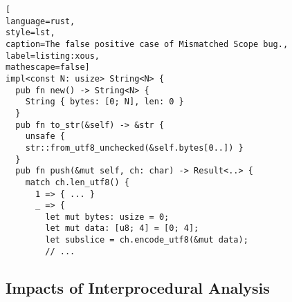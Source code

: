 \begin{lstlisting}[
language=rust, 
style=lst,
caption=The false positive case of Mismatched Scope bug.,
label=listing:xous,
mathescape=false]
impl<const N: usize> String<N> {
  pub fn new() -> String<N> {
    String { bytes: [0; N], len: 0 }
  }
  pub fn to_str(&self) -> &str {
    unsafe { 
    str::from_utf8_unchecked(&self.bytes[0..]) }
  }
  pub fn push(&mut self, ch: char) -> Result<..> {
    match ch.len_utf8() {
      1 => { ... }
      _ => {
        let mut bytes: usize = 0;
        let mut data: [u8; 4] = [0; 4];
        let subslice = ch.encode_utf8(&mut data);
        // ...
\end{lstlisting}












\subsection{Impacts of Interprocedural Analysis} \label{interimpacts}

